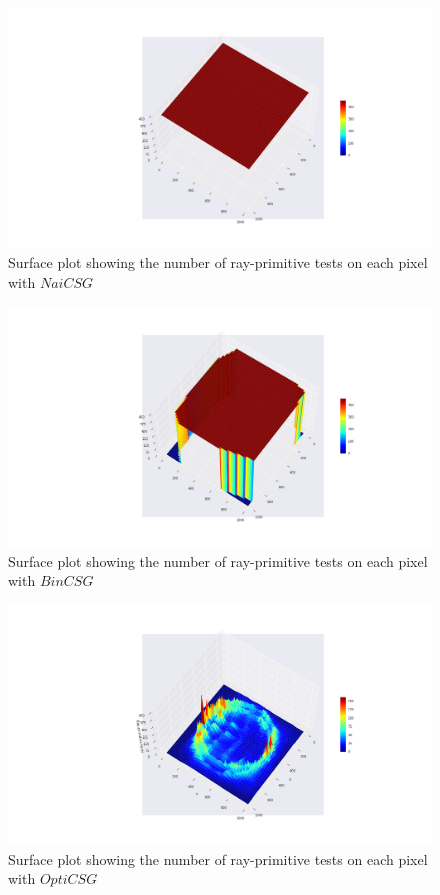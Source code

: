 \documentclass[a4paper,11pt,oneside]{article}
\begin{document}
\begin{figure}[H]
	\centering
	\includegraphics[width=\textwidth]{section5/plots/test_count_naive.png}
	\caption{Surface plot showing the number of ray-primitive tests on each pixel with $NaiCSG$}
	\label{sec5.1:test_count_naive}
\end{figure}

\begin{figure}[H]
	\centering
	\includegraphics[width=\textwidth]{section5/plots/test_count_bin.png}
	\caption{Surface plot showing the number of ray-primitive tests on each pixel with $BinCSG$}
	\label{sec5.1:test_count_bin}
\end{figure}

\begin{figure}[H]
	\centering
	\includegraphics[width=\textwidth]{section5/plots/test_count_optim.png}
	\caption{Surface plot showing the number of ray-primitive tests on each pixel with $OptiCSG$}
	\label{sec5.1:test_count_optim}
\end{figure}
\end{document}
